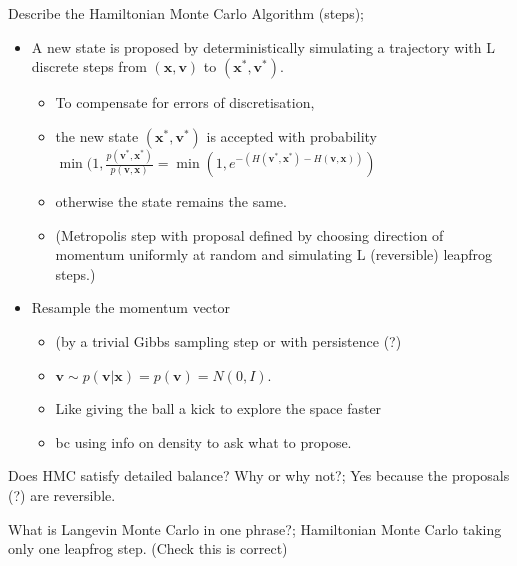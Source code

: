 \documentclass{article}
\begin{document}
Describe the Hamiltonian Monte Carlo Algorithm (steps); \begin{itemize}
    \item A new state is proposed by deterministically simulating a trajectory with L discrete steps from $(\mathbf{x, v})$ to $(\mathbf{x^*, v^*})$. \begin{itemize}
        \item To compensate for errors of discretisation, 
        \item the new state $(\mathbf{x^*, v^*})$ is accepted with probability $\min (1, \frac{p(\mathbf{v^*, x^*})}{p(\mathbf{v, x})}=\min(1, e^{-(H(\mathbf{v^*, x^*})-H(\mathbf{v, x}))})$
        \item otherwise the state remains the same. 
        \item (Metropolis step with proposal defined by choosing direction of momentum uniformly at random and simulating L (reversible) leapfrog steps.) 
    \end{itemize}
    \item Resample the momentum vector \begin{itemize}
        \item (by a trivial Gibbs sampling step or with persistence (?)
        \item $\mathbf{v}\sim p(\mathbf{v|x}) = p(\mathbf{v}) = N(0,I)$.
        \item Like giving the ball a kick to explore the space faster
        \item bc using info on density to ask what to propose.
    \end{itemize}
\end{itemize}

Does HMC satisfy detailed balance? Why or why not?; Yes because the proposals (?) are reversible.

What is Langevin Monte Carlo in one phrase?; Hamiltonian Monte Carlo taking only one leapfrog step. (Check this is correct)

\end{document}
